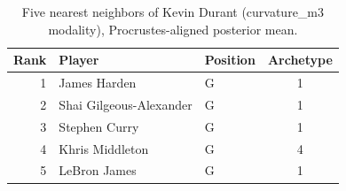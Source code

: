 \begin{table}[htbp]
  \centering\small
  \begin{tabular}{rllc}
    \toprule
    Rank & Player & Position & Archetype \\
    \midrule
    1 & James Harden & G & 1 \\
    2 & Shai Gilgeous-Alexander & G & 1 \\
    3 & Stephen Curry & G & 1 \\
    4 & Khris Middleton & G & 4 \\
    5 & LeBron James & G & 1 \\
    \bottomrule
  \end{tabular}
  \caption{Five nearest neighbors of Kevin Durant (curvature_m3 modality), Procrustes-aligned posterior mean.}
  \label{tab:Kevin_Durant_neighbors_curvature_m3}
\end{table}

